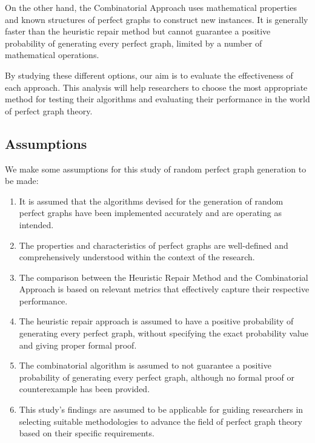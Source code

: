 On the other hand,  the Combinatorial Approach uses mathematical properties and known structures of perfect graphs to construct new instances. It is generally faster than the heuristic repair method but cannot guarantee a positive probability of generating every perfect graph, limited by a number of mathematical operations.

By studying these different options, our aim is to evaluate the effectiveness of each approach. This analysis will help researchers to choose the most appropriate method for testing their algorithms and evaluating their performance in the world of perfect graph theory.


\subsection{Assumptions}

We make some assumptions for this study of random perfect graph generation to be made: 

\begin{enumerate}

\item It is assumed that the algorithms devised for the generation of random perfect graphs have been implemented accurately and are operating as intended.
\item The properties and characteristics of perfect graphs are well-defined and comprehensively understood within the context of the research.
\item The comparison between the Heuristic Repair Method and the Combinatorial Approach is based on relevant metrics that effectively capture their respective performance.
\item The heuristic repair approach is assumed to have a positive probability of generating every perfect graph, without specifying the exact probability value and giving proper formal proof.
\item The combinatorial algorithm is assumed to not guarantee a positive probability of generating every perfect graph, although no formal proof or counterexample has been provided.
\item This study's findings are assumed to be applicable for guiding researchers in selecting suitable methodologies to advance the field of perfect graph theory based on their specific requirements.

\end{enumerate}

\newpage

